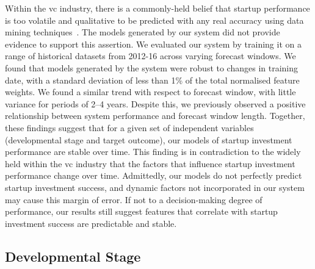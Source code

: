 \documentclass[../thesis/thesis.tex]{subfiles}
\begin{document}
Within the \gls{vc} industry, there is a commonly-held belief that startup performance is too volatile and qualitative to be predicted with any real accuracy using data mining techniques~\cite{stone2014}. The models generated by our system did not provide evidence to support this assertion. We evaluated our system by training it on a range of historical datasets from 2012-16 across varying forecast windows. We found that models generated by the system were robust to changes in training date, with a standard deviation of less than 1\% of the total normalised feature weights. We found a similar trend with respect to forecast window, with little variance for periods of 2--4 years. Despite this, we previously observed a positive relationship between system performance and forecast window length. Together, these findings suggest that for a given set of independent variables (developmental stage and target outcome), our models of startup investment performance are stable over time. This finding is in contradiction to the widely held within the \gls{vc} industry that the factors that influence startup investment performance change over time. Admittedly, our models do not perfectly predict startup investment success, and dynamic factors not incorporated in our system may cause this margin of error. If not to a decision-making degree of performance, our results still suggest features that correlate with startup investment success are predictable and stable.

\subsection{Developmental Stage}
\end{document}
